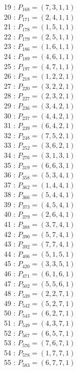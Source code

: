 \documentclass{article}
\begin{document}
{\begin{multicols}{2}
19 : $P_{168}=( 7, 3, 1, 1 )$\\
20 : $P_{171}=( 2, 4, 1, 1 )$\\
21 : $P_{178}=( 1, 5, 1, 1 )$\\
22 : $P_{179}=( 2, 5, 1, 1 )$\\
23 : $P_{186}=( 1, 6, 1, 1 )$\\
24 : $P_{189}=( 4, 6, 1, 1 )$\\
25 : $P_{197}=( 4, 7, 1, 1 )$\\
26 : $P_{218}=( 1, 2, 2, 1 )$\\
27 : $P_{220}=( 3, 2, 2, 1 )$\\
28 : $P_{227}=( 2, 3, 2, 1 )$\\
29 : $P_{236}=( 3, 4, 2, 1 )$\\
30 : $P_{237}=( 4, 4, 2, 1 )$\\
31 : $P_{239}=( 6, 4, 2, 1 )$\\
32 : $P_{248}=( 7, 5, 2, 1 )$\\
33 : $P_{252}=( 3, 6, 2, 1 )$\\
34 : $P_{276}=( 3, 1, 3, 1 )$\\
35 : $P_{319}=( 6, 6, 3, 1 )$\\
36 : $P_{358}=( 5, 3, 4, 1 )$\\
37 : $P_{362}=( 1, 4, 4, 1 )$\\
38 : $P_{366}=( 5, 4, 4, 1 )$\\
39 : $P_{373}=( 4, 5, 4, 1 )$\\
40 : $P_{379}=( 2, 6, 4, 1 )$\\
41 : $P_{388}=( 3, 7, 4, 1 )$\\
42 : $P_{390}=( 5, 7, 4, 1 )$\\
43 : $P_{392}=( 7, 7, 4, 1 )$\\
44 : $P_{406}=( 5, 1, 5, 1 )$\\
45 : $P_{420}=( 3, 3, 5, 1 )$\\
46 : $P_{471}=( 6, 1, 6, 1 )$\\
47 : $P_{502}=( 5, 5, 6, 1 )$\\
48 : $P_{539}=( 2, 2, 7, 1 )$\\
49 : $P_{542}=( 5, 2, 7, 1 )$\\
50 : $P_{543}=( 6, 2, 7, 1 )$\\
51 : $P_{549}=( 4, 3, 7, 1 )$\\
52 : $P_{567}=( 6, 5, 7, 1 )$\\
53 : $P_{576}=( 7, 6, 7, 1 )$\\
54 : $P_{578}=( 1, 7, 7, 1 )$\\
55 : $P_{583}=( 6, 7, 7, 1 )$\\
\end{multicols}
}
\end{document}
